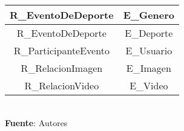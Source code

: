 \begin{table}[!htb]
\begin{center}
{\begin{tabular}{|p{4cm}|p{4cm}|p{4cm}|p{4cm}|}
			\hline
			\multicolumn{2}{|c|}{R_EventoDeDeporte} & 
			\multicolumn{2}{c|}{E_Genero} \\
			\hline
			\multicolumn{2}{|c|}{R_EventoDeDeporte} & 
			\multicolumn{2}{c|}{E_Deporte} \\
			\hline
			\multicolumn{2}{|c|}{R_ParticipanteEvento} & 
			\multicolumn{2}{c|}{E_Usuario} \\
			\hline
			\multicolumn{2}{|c|}{R_RelacionImagen} & 
			\multicolumn{2}{c|}{E_Imagen} \\
			\hline
			\multicolumn{2}{|c|}{R_RelacionVideo} & 
			\multicolumn{2}{c|}{E_Video} \\
			\hline
		\end{tabular}
		} \\
		\textbf{Fuente}: Autores
	\end{center}
\end{table}
